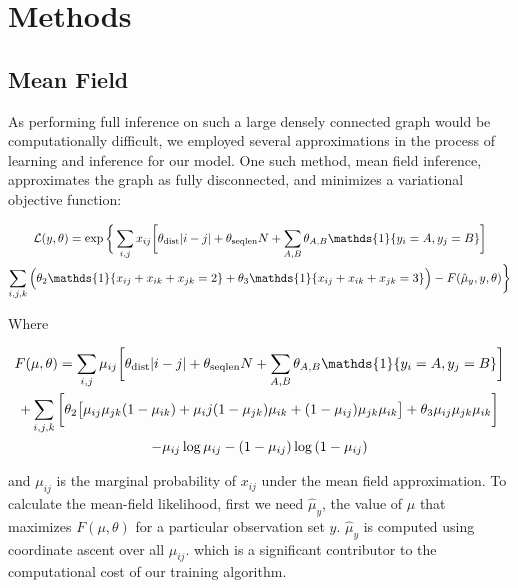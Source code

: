 \documentclass{article}
\begin{document}
\section{Methods}
\subsection{Mean Field}

As performing full inference on such a large densely connected graph would be computationally difficult, we employed several approximations in the process of learning and inference for our model. One such method, mean field inference, approximates the graph as fully disconnected, and minimizes a variational objective function:

\begin{multline} \label{eq:mflikelihood}
\mathcal{L}(y, \theta) = \exp\bigg\{\sum_{i, j} x_{ij}\bigg[\theta_{\textmd{dist}}|i - j|+ \theta_{\textmd{seqlen}}N + \sum_{A, B} \theta_{A, B}\mathds{1}\{y_i = A, y_j = B\}\bigg] \\
\sum_{i, j, k}\Big(\theta_2\mathds{1}\{x_{ij} + x_{ik} + x_{jk} = 2\} + \theta_3\mathds{1}\{x_{ij} + x_{ik} + x_{jk} = 3\}\Big)  - F(\hat{\mu}_{y}, y, \theta) \bigg\}
\end{multline}

Where 

\begin{multline} \label{eq:f}
F(\mu, \theta) = \sum_{i, j}\mu_{ij}\bigg[\theta_{\textmd{dist}}|i - j|+ \theta_{\textmd{seqlen}}N + \sum_{A, B} \theta_{A, B}\mathds{1}\{y_i = A, y_j = B\}\bigg] \\
+ \sum_{i, j, k} \bigg[\theta_2 \big[\mu_{ij}\mu_{jk}(1-\mu_{ik}) + \mu_ij(1-\mu_{jk})\mu_{ik} + (1 - \mu_{ij})\mu_{jk}\mu_{ik} \big] + \theta_3 \mu_{ij}\mu_{jk}\mu_{ik} \bigg] \\
- \mu_{ij} \log{\mu_{ij}} - (1 - \mu_{ij})\log{(1 - \mu_{ij})}
\end{multline}

and $\mu_{ij}$ is the marginal probability of $x_{ij}$ under the mean field approximation. To calculate the mean-field likelihood, first we need $\hat{\mu}_{y}$, the value of $\mu$ that maximizes $F(\mu, \theta)$ for a particular observation set $y$. $\hat{\mu}_{y}$ is computed using coordinate ascent over all $\mu_{ij}$. which is a significant contributor to the computational cost of our training algorithm.
\end{document}
